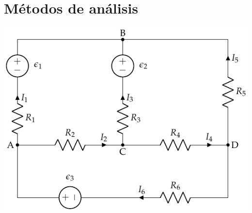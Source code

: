 \documentclass[aspectratio=169, xcolor={usenames,svgnames,dvipsnames}]{beamer}
\begin{document}
\section{Métodos de análisis}

\begin{frame}
\begin{center}
\includegraphics[height=0.95\textheight]{../figs/mallas1.pdf}
\end{center}
\end{frame}
\end{document}
